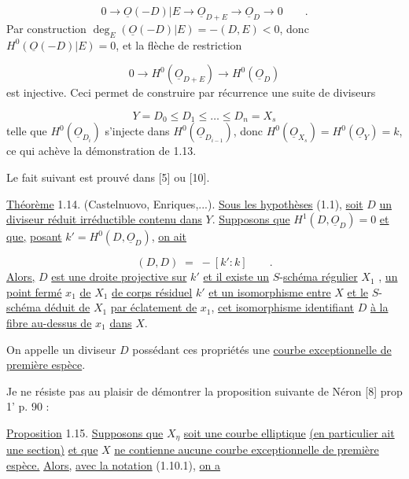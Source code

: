 \begin{equation*}
0 \longrightarrow \underline{O}(-D)|E \longrightarrow \underline{O}_{D+E} \longrightarrow \underline{O}_D \longrightarrow 0 \qquad .
\end{equation*}
Par construction $\deg_E(\underline{O}(-D)|E) = - (D,E) < 0$, donc $H^0(\underline{O}(-D)|E) = 0$, et la flèche de restriction

\begin{equation*}
0 \longrightarrow H^0(\underline{O}_{D+E}) \longrightarrow H^0(\underline{O}_D)
\end{equation*}
est injective. Ceci permet de construire par récurrence une suite de diviseurs

\begin{equation*}
Y = D_0 \leq D_1 \leq \ldots \leq D_n = X_s
\end{equation*}
telle que $H^0(\underline{O}_{D_i})$ s'injecte dans $H^0(\underline{O}_{D_{i-1}})$, donc $H^0(\underline{O}_{X_s}) = H^0(\underline{O}_Y) = k$, ce qui achève la démonstration de 1.13.



Le fait suivant est prouvé dans [5] ou [10].

\underline{Théorème} 1.14. (Castelnuovo, Enriques,...). \underline{Sous les hypothèses} (1.1), \underline{soit} $D$ \underline{un diviseur réduit irréductible contenu dans} $Y$. \underline{Supposons que} $H^1(D,\underline{O}_D) = 0$ \underline{et que,} \underline{posant} $k' = H^0(D,\underline{O}_D)$, \underline{on ait}

\begin{equation*}
(D,D) \; = \; - [k' : k] \qquad .
\end{equation*}
\underline{Alors,} $D$ \underline{est une droite projective sur} $k'$ \underline{et il existe un} $S$-\underline{schéma régulier} $X_1$ , \underline{un point fermé} $x_1$ \underline{de} $X_1$ \underline{de corps résiduel} $k'$ \underline{et un isomorphisme entre} $X$ \underline{et le} $S$-\underline{schéma déduit de} $X_1$ \underline{par éclatement de} $x_1$, \underline{cet isomorphisme identifiant} $D$ \underline{à la fibre au-dessus de} $x_1$ \underline{dans} $X$.

On appelle un diviseur $D$ possédant ces propriétés une \underline{courbe exceptionnelle de première espèce}.

Je ne résiste pas au plaisir de démontrer la proposition suivante de Néron [8] prop 1' p. 90 :

\underline{Proposition} 1.15. \underline{Supposons que} $X_\eta$ \underline{soit une courbe elliptique} \underline{(en particulier ait une section)} \underline{et que} $X$ \underline{ne contienne aucune courbe exceptionnelle de première espèce.} \underline{Alors,} \underline{avec la notation} (1.10.1), \underline{on a}

